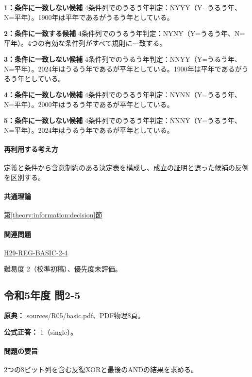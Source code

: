 \noindent\textbf{1：条件に一致しない候補} 4条件列でのうるう年判定：NYYY（Y=うるう年、N=平年）。1900年は平年であるがうるう年としている。\par

\noindent\textbf{2：条件に一致する候補} 4条件列でのうるう年判定：NYNY（Y=うるう年、N=平年）。4つの有効な条件列がすべて規則に一致する。\par

\noindent\textbf{3：条件に一致しない候補} 4条件列でのうるう年判定：NNYY（Y=うるう年、N=平年）。2024年はうるう年であるが平年としている。1900年は平年であるがうるう年としている。\par

\noindent\textbf{4：条件に一致しない候補} 4条件列でのうるう年判定：NYNN（Y=うるう年、N=平年）。2000年はうるう年であるが平年としている。\par

\noindent\textbf{5：条件に一致しない候補} 4条件列でのうるう年判定：NNNY（Y=うるう年、N=平年）。2024年はうるう年であるが平年としている。\par

\paragraph{再利用する考え方} 定義と条件から含意制約のある決定表を構成し、成立の証明と誤った候補の反例を区別する。

\paragraph{共通理論} \hyperref[theory:information:decision]{第\ref*{theory:information:decision}節}

\paragraph{関連問題} \hyperref[q:h29-reg-basic-2-4]{H29-REG-BASIC-2-4}

\par 難易度 2（校準初稿）、優先度未評価。

\subsection{令和5年度 問2-5}
\label{q:r05-reg-basic-2-5}

\noindent\textbf{原典：} sources/R05/basic.pdf、PDF物理8頁。

\textbf{公式正答：} 1（single）。

\paragraph{問題の要旨} 2つの8ビット列を含む反復XORと最後のANDの結果を求める。

